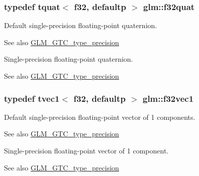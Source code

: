\subsubsection[{f32quat}]{\setlength{\rightskip}{0pt plus 5cm}typedef tquat$<$ f32, defaultp $>$ {\bf glm\+::f32quat}}\label{group__gtc__type__precision_gac59c4d798396552e4bbb866b3d8a2f18}
Default single-\/precision floating-\/point quaternion. \begin{DoxySeeAlso}{See also}
\hyperlink{group__gtc__type__precision}{G\+L\+M\+\_\+\+G\+T\+C\+\_\+type\+\_\+precision}
\end{DoxySeeAlso}
Single-\/precision floating-\/point quaternion. \begin{DoxySeeAlso}{See also}
\hyperlink{group__gtc__type__precision}{G\+L\+M\+\_\+\+G\+T\+C\+\_\+type\+\_\+precision} 
\end{DoxySeeAlso}
\hypertarget{group__gtc__type__precision_ga6fb588b465f2252b473582159c31c40c}{}
\subsubsection[{f32vec1}]{\setlength{\rightskip}{0pt plus 5cm}typedef tvec1$<$ f32, defaultp $>$ {\bf glm\+::f32vec1}}\label{group__gtc__type__precision_ga6fb588b465f2252b473582159c31c40c}
Default single-\/precision floating-\/point vector of 1 components. \begin{DoxySeeAlso}{See also}
\hyperlink{group__gtc__type__precision}{G\+L\+M\+\_\+\+G\+T\+C\+\_\+type\+\_\+precision}
\end{DoxySeeAlso}
Single-\/precision floating-\/point vector of 1 component. \begin{DoxySeeAlso}{See also}
\hyperlink{group__gtc__type__precision}{G\+L\+M\+\_\+\+G\+T\+C\+\_\+type\+\_\+precision} 
\end{DoxySeeAlso}
\hypertarget{group__gtc__type__precision_ga8681dee3524dea86388178c49c27079a}{}
